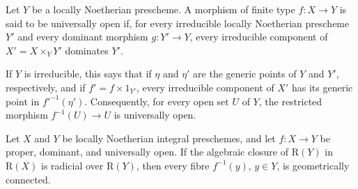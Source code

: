 \begin{definition}[4.3.9]
\label{III.4.3.9}
Let $Y$ be a locally Noetherian prescheme.  A morphism \textup{of finite type}
$f:X\to Y$ is said to be universally open if, for every
irreducible locally Noetherian prescheme $Y'$ and every dominant
morphism $g:Y'\to Y$, every irreducible component of
$X'=X\times_Y Y'$ dominates $Y'$.
\end{definition}

If $Y$ is irreducible, this says that if $\eta$ and $\eta'$ are the
generic points of $Y$ and $Y'$, respectively, and if
$f'=f\times 1_{Y'}$, every irreducible component of $X'$ has its
generic point in $f'^{-1}(\eta')$.  Consequently, for every open set
$U$ of $Y$, the restricted morphism $f^{-1}(U)\to U$ is universally
open.

\begin{corollary}[4.3.10]
\label{III.4.3.10}
Let $X$ and $Y$ be locally Noetherian integral preschemes, and let
$f:X\to Y$ be proper, dominant, and universally open.  If the
algebraic closure of $\mathrm{R}(Y)$ in $\mathrm{R}(X)$ is radicial over
$\mathrm{R}(Y)$, then every fibre $f^{-1}(y)$, $y\in Y$, is geometrically
connected.
\end{corollary}

